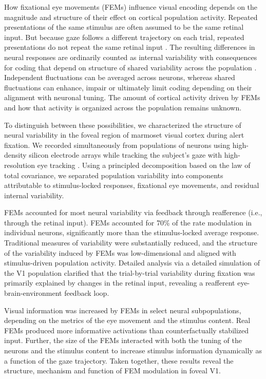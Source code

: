 \documentclass{lite}
\begin{document}
How fixational eye movements (FEMs) influence visual encoding depends on the magnitude and structure of their effect on cortical population activity. Repeated presentations of the same stimulus are often assumed to be the same retinal input. But because gaze follows a different trajectory on each trial, repeated presentations do not repeat the same retinal input \cite{mcfarland2016variability}. The resulting differences in neural responses are ordinarily counted as internal variability \cite{shadlen1998variable} with consequences for coding that depend on structure of shared variability across the population \cite{averbeck2006neural, moreno2014information}. Independent fluctuations can be averaged across neurons, whereas shared fluctuations can enhance, impair or ultimately limit coding depending on their alignment with neuronal tuning. The amount of cortical activity driven by FEMs and how that activity is organized across the population remains unknown.

To distinguish between these possibilities, we characterized the structure of neural variability in the foveal region of marmoset visual cortex during alert fixation. We recorded simultaneously from populations of neurons using high-density silicon electrode arrays while tracking the subject's gaze with high-resolution eye tracking \cite{yates2023detailed, ressmeyer2025openirisdpi, wu2023high}. Using a principled decomposition based on the law of total covariance, we separated population variability into components attributable to stimulus-locked responses, fixational eye movements, and residual internal variability. 

FEMs accounted for most neural variability via feedback through reafference (i.e., through the retinal input). FEMs accounted for 70\% of the rate modulation in individual neurons, significantly more than the stimulus-locked average response. Traditional measures of variability were substantially reduced, and the structure of the variability induced by FEMs was low-dimensional and aligned with stimulus-driven population activity. Detailed analysis via a detailed simulation of the V1 population clarified that the trial-by-trial variability during fixation was primarily explained by changes in the retinal input, revealing a reafferent eye-brain-environment feedback loop.


Visual information was increased by FEMs in select neural subpopulations, depending on the metrics of the eye movement and the stimulus content. Real FEMs produced more informative activations than counterfactually stabilized input. Further, the size of the FEMs interacted with both the tuning of the neurons and the stimulus content to increase stimulus information dynamically as a function of the gaze trajectory. Taken together, these results reveal the structure, mechanism and function of FEM modulation in foveal V1.
\end{document}
